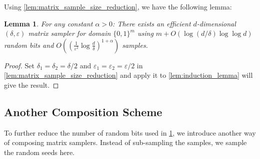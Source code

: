 \documentclass[11pt,letterpaper]{article}
\newtheorem{lemma}[theorem]{Lemma}
\newcommand{\eps}{\varepsilon}
\newcommand{\1}{\mathbbm{1}}
\newcommand{\zo}{\{0, 1\}}
\begin{document}
Using \cref{lem:matrix_sample_size_reduction}, we have the following lemma:
\begin{lemma}
    \label{lem:sampler_without_replacement}
    For any constant $\alpha > 0$:
    There exists an efficient $d$-dimensional $(\delta, \eps)$ matrix sampler for domain $\zo^m$ using $m + O(\log(d / \delta) \log\log d)$ random bits and $O((\frac{1}{\eps^2}\log\frac{d}{\delta})^{1 + \alpha})$ samples.
\end{lemma}
\begin{proof}
    Set $\delta_1 = \delta_2 = \delta / 2$ and $\eps_1 = \eps_2 = \eps / 2$ in  \cref{lem:matrix_sample_size_reduction} and apply it to \cref{lem:induction_lemma} will give the result.
\end{proof}
\subsection{Another Composition Scheme}
To further reduce the number of random bits used in \cref{lem:sampler_without_replacement}, we introduce another way of composing matrix samplers. 
Instead of sub-sampling the samples, we sample the random seeds here.

\anotherComposition*
\end{document}
